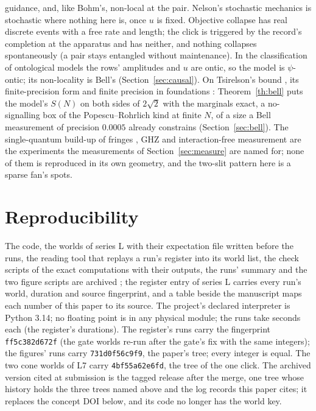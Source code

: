 \documentclass[11pt]{article}
\theoremstyle{definition}
\begin{document}
guidance, and, like Bohm's, non-local at the pair. Nelson's stochastic
mechanics \cite{nelson1966} is stochastic where nothing here is, once
$u$ is fixed. Objective collapse \cite{grw1986,bassi2013} has real
discrete events with a free rate and length; the click is triggered by
the record's completion at the apparatus and has neither, and nothing
collapses spontaneously (a pair stays entangled without maintenance). In
the classification of ontological models \cite{spekkens2007,hs2010} the
rows' amplitudes and $u$ are ontic, so the model is $\psi$-ontic; its
non-locality is Bell's (Section~\ref{sec:causal}). On Tsirelson's bound
\cite{tsirelson1980,pr1994}, its finite-precision form \cite{bhz2005}
and finite precision in foundations \cite{meyer1999,kent1999}: Theorem~\ref{th:bell} puts the model's
$S(N)$ on both sides of $2\sqrt2$ with the marginals exact, a
no-signalling box of the Popescu--Rohrlich kind at finite $N$, of a size
a Bell measurement of precision $0.0005$ already constrains
(Section~\ref{sec:bell}). The single-quantum build-up of fringes
\cite{tonomura1989,grangier1986}, GHZ \cite{ghsz1990,mermin1990,pan2000}
and interaction-free measurement \cite{ev1993} are the experiments the
measurements of Section~\ref{sec:measure} are named for; none of them is
reproduced in its own geometry, and the two-slit pattern here is a sparse
fan's spots.

\section*{Reproducibility}
The code, the worlds of series L with their expectation file written
before the runs, the reading tool that replays a run's register into its
world list, the check scripts of the exact computations with their
outputs, the runs' summary and the two figure scripts are archived
\cite{zenodo}; the register entry of series L carries every run's world,
duration and source fingerprint, and a table beside the manuscript maps
each number of this paper to its source. The project's declared
interpreter is Python 3.14; no floating point is in any physical module;
the runs take seconds each (the register's durations). The register's runs carry the
fingerprint \texttt{ff5c382d672f} (the gate worlds re-run after the
gate's fix with the same integers); the figures' runs carry
\texttt{731d0f56c9f9}, the paper's tree; every integer is equal. The two
cone worlds of L7 carry \texttt{4bf55a62e6fd}, the tree of the one click.
The archived version cited at submission is the tagged release after the
merge, one tree whose history holds the three trees named above and the
log records this paper cites; it replaces the concept DOI below, and its
code no longer has the world key.
\end{document}
